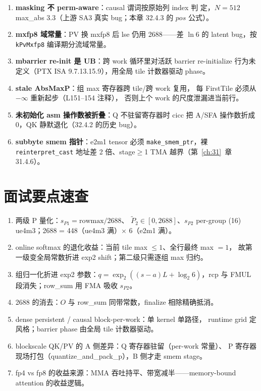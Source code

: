 \begin{enumerate}[itemsep=2pt,topsep=2pt]
  \item \textbf{masking 不 perm-aware}：causal 谓词按原始列 index 判
        定，$N{=}512$ max\_abs 3.3（上游 SA3 真实 bug；本章 32.4.3 的
        $pos$ 公式）。
  \item \textbf{mxfp8 域常量}：PV 换 mxfp8 后 lse 仍用 2688——差
        $\ln6$ 的 latent bug，按 \texttt{kPvMxfp8} 编译期分流域常量。
  \item \textbf{mbarrier re-init 是 UB}：跨 work 循环里对活跃 barrier
        re-initialize 行为未定义（PTX ISA 9.7.13.15.9），用全局 tile
        计数器驱动 phase。
  \item \textbf{stale AbsMaxP}：组 max 寄存器跨 tile/跨 work 复用，
        每 FirstTile 必须从 $-\infty$ 重新起步（L151--154 注释），
        否则上个 work 的尺度泄漏进当前行。
  \item \textbf{未初始化 asm 操作数被折叠}：Q 不驻留寄存器时 cicc 把
        A/SFA 操作数折成 0，QK 静默退化（32.4.2 的历史 bug）。
  \item \textbf{subbyte smem 指针}：e2m1 tensor 必须
        \texttt{make\_smem\_ptr}，裸 \texttt{reinterpret\_cast} 地址差
        2 倍、stage$\ge$1 TMA 越界（第~\ref{ch:31}~章 31.4.6）。
\end{enumerate}

\section{面试要点速查}

\begin{enumerate}[itemsep=2pt,topsep=2pt]
  \item 两级 P 量化：$s_{P1}=\mathrm{rowmax}/2688$、
        $\tilde P_2\in[0,2688]$、$s_{P2}$ per-group (16) ue4m3；2688 =
        448（ue4m3 满）$\times$ 6（e2m1 满）。
  \item online softmax 的退化收益：当前 tile max $\le1$、全行最终 max $=1$，
        故第一级变全局常数折进 exp2 shift；第二级只需逐组 max 归约。
  \item 组归一化折进 exp2 参数：$q=\exp_2((s-a)L+\log_2 6)$，rcp 与
        FMUL 段消失；row\_sum 用 FMA 吸收 $s_{P2}$。
  \item 2688 的消去：$O$ 与 row\_sum 同带常数，finalize 相除精确抵消。
  \item dense persistent / causal block-per-work：单 kernel 单路径，
        runtime grid 定风格；barrier phase 由全局 tile 计数器驱动。
  \item blockscale QK/PV 的 A 侧差异：Q 寄存器驻留（per-work 常量）、
        P 寄存器现场打包（quantize\_and\_pack\_p），B 侧才走 smem
        stage。
  \item fp4 vs fp8 的收益来源：MMA 吞吐持平、带宽减半——memory-bound
        attention 的收益逻辑。
\end{enumerate}

